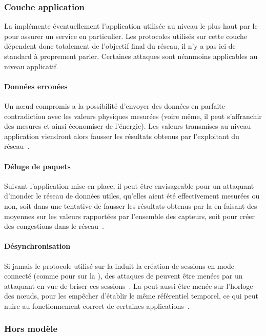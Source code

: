     \subsubsection{Couche application}
La  implémente éventuellement l'application utilisée au niveau le plus haut par le \rc pour assurer un service en particulier.
Les protocoles utilisés sur cette couche dépendent donc totalement de l'objectif final du réseau, il n'y a pas ici de standard à proprement parler.
Certaines attaques sont néanmoins applicables au niveau applicatif.

        \paragraph{Données erronées}
Un nœud compromis a la possibilité d'envoyer des données en parfaite contradiction avec les valeurs physiques mesurées (voire même, il peut s'affranchir des mesures et ainsi économiser de l'énergie).
Les valeurs transmises au niveau application viendront alors fausser les résultats obtenus par l'exploitant du réseau~\cite{SZFDXC14}.

        \paragraph{Déluge de paquets}
Suivant l'application mise en place, il peut être envisageable pour un attaquant d'inonder le réseau de données utiles, qu'elles aient été effectivement mesurées ou non, soit dans une tentative de fausser les résultats obtenus par la \sdb en faisant des moyennes sur les valeurs rapportées par l'ensemble des capteurs, soit pour créer des congestions dans le réseau~\cite{AJ11}.

\paragraph{Désynchronisation}
Si jamais le protocole utilisé sur la  induit la création de sessions en mode connecté (comme pour \tcp sur la ), des attaques de \desync peuvent être menées par un attaquant en vue de briser ces sessions~\cite{AD14}.
La \desync peut aussi être menée sur l'horloge des nœuds, pour les empêcher d'établir le même référentiel temporel, ce qui peut nuire au fonctionnement correct de certaines applications~\cite{SZFDXC14}.

    \subsubsection{Hors modèle}
